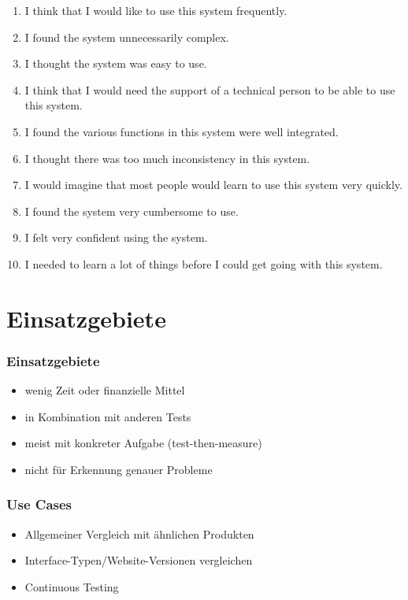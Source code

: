 \documentclass[12pt, aspectratio=169]{beamer}
\begin{document}
\begin{frame}
	\begin{enumerate}
		\item <1> I think that I would like to use this system frequently.
		\item <1> I found the system unnecessarily complex.
		\item <1> I thought the system was easy to use.
		\item <1> I think that I would need the support of a technical person to be able to use this system.
		\item <1> I found the various functions in this system were well integrated.
		\item <1> I thought there was too much inconsistency in this system.
		\item <1> I would imagine that most people would learn to use this system very quickly.
		\item <1> I found the system very cumbersome to use.
		\item <1> I felt very confident using the system.
		\item <1> I needed to learn a lot of things before I could get going with this system.
	\end{enumerate}
\end{frame}

\section{Einsatzgebiete}
\begin{frame}
	\frametitle{Einsatzgebiete}
	\begin{itemize}
		\item<1> wenig Zeit oder finanzielle Mittel
		\item<1> in Kombination mit anderen Tests
		\item<1> meist mit konkreter Aufgabe (test-then-measure)
		\item<1> nicht für Erkennung genauer Probleme
	\end{itemize}
\end{frame}

	
\begin{frame}
	\frametitle{Use Cases}
	\begin{itemize}
		\item<1> Allgemeiner Vergleich mit ähnlichen Produkten
		\item<1> Interface-Typen/Website-Versionen vergleichen
		\item<1> Continuous Testing
	\end{itemize}
\end{frame}
\end{document}

